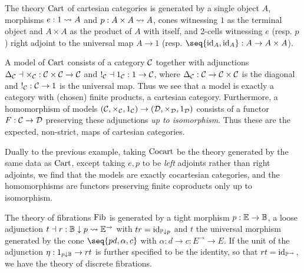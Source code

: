 \documentclass[../thesis.tex]{subfiles}
\begin{document}
  \begin{example}
    The theory ${\mathrm{Cart}}$ of cartesian categories is generated by a single object $A$, morphisms
    $e : 1 \rightsquigarrow A$ and $p : A \times A \rightsquigarrow A$, cones witnessing $1$ as the terminal object
    and $A \times A$ as the product of $A$ with itself, and 2-cells witnessing $e$ (resp. $p$)
    right adjoint to the universal map $A \to 1$ (resp. $\seq{\id_A, \id_A} : A \to A \times A$).

    A model of ${\mathrm{Cart}}$ consists of a category ${\mathcal{C}}$ together with adjunctions $\Delta_{\mathcal{C}} \dashv \times_{\mathcal{C}}
    : {\mathcal{C}} \times {\mathcal{C}} \to {\mathcal{C}}$ and $!_{\mathcal{C}} \dashv 1_{\mathcal{C}} : 1 \to {\mathcal{C}}$, where $\Delta_{\mathcal{C}} : {\mathcal{C}} \to {\mathcal{C}} \times
    {\mathcal{C}}$ is the diagonal and $!_{\mathcal{C}} : {\mathcal{C}} \to 1$ is the universal map. Thus we see that a model is exactly
    a category with (chosen) finite products, a cartesian category. Furthermore, a homomorphism of models
    $({\mathcal{C}},\times_{\mathcal{C}},1_{\mathcal{C}}) \to ({\mathcal{D}}, \times_{\mathcal{D}}, 1_{\mathcal{D}})$ consists of a functor $F : {\mathcal{C}} \to {\mathcal{D}}$ preserving
    these adjunctions \emph{up to isomorphism}. Thus these are the expected, non-strict, maps of cartesian
    categories.
  \end{example}
  \begin{example}
    Dually to the previous example, taking ${\mathrm{Cocart}}$ be the theory generated by the same data as ${\mathrm{Cart}}$,
    except taking $e,p$ to be \emph{left} adjoints rather than right adjoints, we find that the models
    are exactly cocartesian categories, and the homomorphisms are functors preserving finite coproducts
    only up to isomorphism.
  \end{example}
  \begin{example}\label{ex:fib}
    The theory of fibrations ${\mathrm{Fib}}$ is generated by a tight morphism $p : {\mathbb{E}} \to {\mathbb{B}}$, a loose adjunction $
    t \dashv r : {\mathbb{B}} \mathrel{\downarrow} p \rightsquigarrow {\mathbb{E}}^\to$ with $tr = {\mathrm{id}}_{{\mathbb{P}} \mathrel{\downarrow} p}$ and $t$ the universal morphism
    generated by the cone $\seq{p d, \alpha, c}$ with $\alpha : d \to c : E^\to \to E$. If the unit of the
    adjunction $\eta : 1_{p \mathrel{\downarrow} {\mathbb{B}}} \to rt$ is further specified to be the identity, so that $rt = \id_%
    {\bP^\to}$, we have the theory of discrete fibrations.
  \end{example}
  
\end{document}
